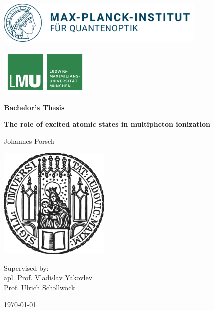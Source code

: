 \begin{titlepage}
    \centering
    
    \begin{minipage}{0.5\textwidth}
        \includegraphics[height=2cm]{figures/mpq.png}
    \end{minipage}
    \hfill
    \begin{minipage}{0.3\textwidth}
        \includegraphics[height=2.3cm]{figures/lmu-logo.pdf}
    \end{minipage}

    

    \vspace{0.5cm}

    
    \vspace{2cm}

    {\Large \bfseries Bachelor's Thesis}

    \vspace{0.5cm}
    
    {\huge\bfseries The role of excited atomic states in multiphoton ionization\\[0.4cm]}
    
    \vspace{1.5cm}
    
    {\Large Johannes Porsch}
    
    
    \vfill
    
    \includegraphics[width = 0.4\textwidth]{figures/sigillum.png}

     \vfill
    
    Supervised by: \\apl. Prof. Vladislav Yakovlev \\Prof. Ulrich Schollwöck 

    \vfill
    
    {\Large \today}
    
\end{titlepage}